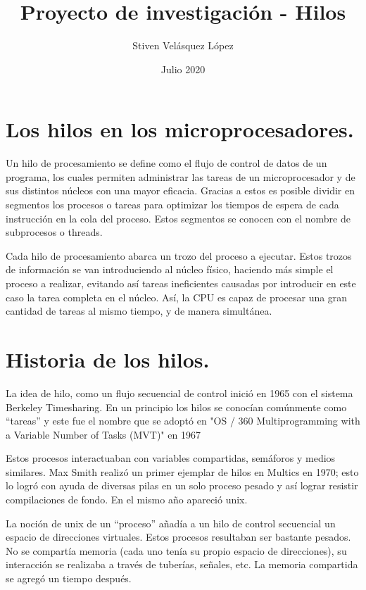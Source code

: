\documentclass{article}
\title{Proyecto de investigación - Hilos}
\author{Stiven Velásquez López }
\date{Julio 2020}
\begin{document}
\maketitle

\section{Los hilos en los microprocesadores.} \cite{Ieee2020}
Un hilo de procesamiento se define como el flujo de control de datos de un programa, los cuales permiten administrar las tareas de un microprocesador y de sus distintos núcleos con una mayor eficacia. Gracias a estos es posible dividir en segmentos los procesos o tareas para optimizar los tiempos de espera de cada instrucción en la cola del proceso. Estos segmentos se conocen con el nombre de subprocesos o threads.

Cada hilo de procesamiento abarca un trozo del proceso a ejecutar. Estos trozos de información se van introduciendo al núcleo físico, haciendo más simple el proceso a realizar, evitando así tareas ineficientes causadas por  introducir en este caso la tarea completa en el núcleo. Así, la CPU es capaz de procesar una gran cantidad de tareas al mismo tiempo, y de manera simultánea.


\section{Historia de los hilos.} \cite{Kleiman1996}
La idea de hilo, como un  flujo secuencial de control inició en 1965 con el sistema Berkeley Timesharing. \cite{Dijkstra65} En un principio los hilos se conocían comúnmente como “tareas” y este fue el nombre que se adoptó en "OS / 360 Multiprogramming with a Variable Number of Tasks (MVT)" en 1967

Estos procesos interactuaban con variables compartidas, semáforos y medios similares. Max Smith realizó un primer ejemplar de hilos en Multics en 1970; esto lo logró con ayuda de diversas pilas en un solo proceso pesado y así lograr resistir compilaciones de fondo. En el mismo año apareció unix.

La noción de unix de un “proceso” añadía a un hilo de control secuencial un espacio  de direcciones virtuales\cite{Saltzer66}. Estos procesos resultaban ser bastante pesados. No se  compartía memoria (cada uno tenía su propio espacio de direcciones), su interacción se realizaba a través de tuberías, señales, etc. La memoria compartida se agregó un tiempo después.
\end{document}
